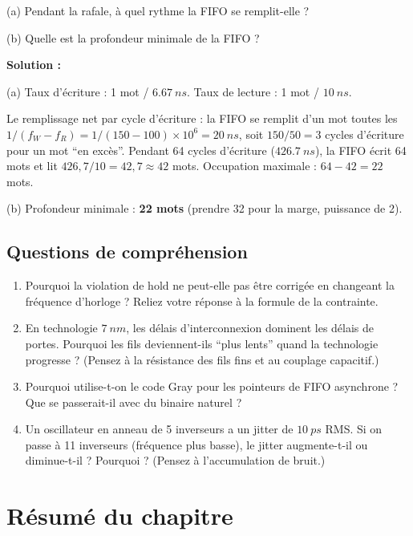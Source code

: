 \documentclass[12pt,a4paper,twoside]{book}
\begin{document}
(a) Pendant la rafale, à quel rythme la FIFO se remplit-elle ?

(b) Quelle est la profondeur minimale de la FIFO ?

\begin{pratique}
\textbf{Solution :}

(a) Taux d'écriture : 1 mot / $\SI{6.67}{ns}$. Taux de lecture : 1 mot / $\SI{10}{ns}$.

Le remplissage net par cycle d'écriture : la FIFO se remplit d'un mot toutes les $1/(f_W - f_R) = 1/(150-100)\times10^6 = \SI{20}{ns}$, soit $150/50 = 3$ cycles d'écriture pour un mot ``en excès''. Pendant 64 cycles d'écriture ($\SI{426.7}{ns}$), la FIFO écrit 64 mots et lit $426{,}7/10 = 42{,}7 \approx 42$ mots. Occupation maximale : $64 - 42 = 22$ mots.

(b) Profondeur minimale : \textbf{22 mots} (prendre 32 pour la marge, puissance de 2).
\end{pratique}

\subsection*{Questions de compréhension}

\begin{enumerate}[nosep]
\item Pourquoi la violation de hold ne peut-elle pas être corrigée en changeant la fréquence d'horloge ? Reliez votre réponse à la formule de la contrainte.
\item En technologie $\SI{7}{nm}$, les délais d'interconnexion dominent les délais de portes. Pourquoi les fils deviennent-ils ``plus lents'' quand la technologie progresse ? (Pensez à la résistance des fils fins et au couplage capacitif.)
\item Pourquoi utilise-t-on le code Gray pour les pointeurs de FIFO asynchrone ? Que se passerait-il avec du binaire naturel ?
\item Un oscillateur en anneau de 5 inverseurs a un jitter de $\SI{10}{ps}$ RMS. Si on passe à 11 inverseurs (fréquence plus basse), le jitter augmente-t-il ou diminue-t-il ? Pourquoi ? (Pensez à l'accumulation de bruit.)
\end{enumerate}

\section*{Résumé du chapitre}
\end{document}

